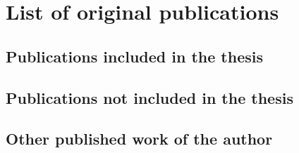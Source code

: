 \chapter*{List of original publications}

\section*{Publications included in the thesis}
\section*{Publications not included in the thesis}
\section*{Other published work of the author}